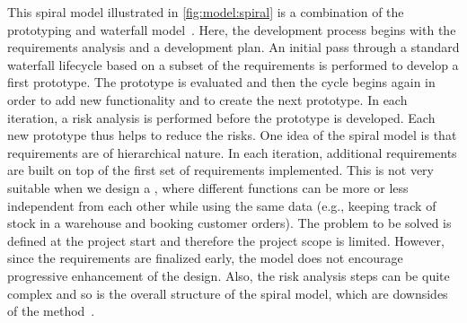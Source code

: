 This spiral model illustrated in \cref{fig:model:spiral} is a combination of the prototyping and waterfall model~\cite{PA2009SETAP,GMTM2011DDLC}.
Here, the development process begins with the requirements analysis and a development plan.
An initial pass through a standard waterfall lifecycle based on a subset of the requirements is performed to develop a first prototype.
The prototype is evaluated and then the cycle begins again in order to add new functionality and to create the next prototype.
In each iteration, a risk analysis is performed before the prototype is developed.
Each new prototype thus helps to reduce the risks.
One idea of the spiral model is that requirements are of hierarchical nature.
In each iteration, additional requirements are built on top of the first set of requirements implemented.
This is not very suitable when we design a \db, where different functions can be more or less independent from each other while using the same data (e.g., keeping track of stock in a warehouse and booking customer orders).
The problem to be solved is defined at the project start and therefore the project scope is limited.
However, since the requirements are finalized early, the model does not encourage progressive enhancement of the design.
Also, the risk analysis steps can be quite complex and so is the overall structure of the spiral model, which are downsides of the method~\cite{S2007OOSE,GMTM2011DDLC}.

